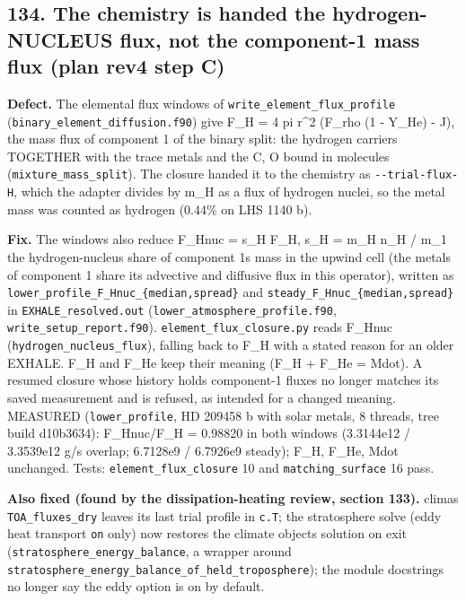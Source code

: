 \documentclass[english,a4paper]{my_memo}
\begin{document}
\subsection{134. The chemistry is handed the hydrogen-NUCLEUS flux, not the component-1 mass flux (plan rev4 step C)}\label{134-the-chemistry-is-handed-the-hydrogen-nucleus-flux-not-the-component-1-mass-flux-plan-rev4-step-c}

\textbf{Defect.} The elemental flux windows of \texttt{write\_element\_flux\_profile}
(\texttt{binary\_element\_diffusion.f90}) give F\_H = 4 pi r\^{}2 (F\_rho (1 - Y\_He) - J),
the mass flux of component 1 of the binary split: the hydrogen carriers
TOGETHER with the trace metals and the C, O bound in molecules
(\texttt{mixture\_mass\_split}). The closure handed it to the chemistry as
\texttt{-\/-trial-flux-H}, which the adapter divides by m\_H as a flux of hydrogen
nuclei, so the metal mass was counted as hydrogen (0.44\% on LHS 1140 b).

\textbf{Fix.} The windows also reduce F\_Hnuc = s\_H F\_H, s\_H = m\_H n\_H / m\_1 the
hydrogen-nucleus share of component 1\textquotesingle s mass in the upwind cell (the metals of
component 1 share its advective and diffusive flux in this operator), written
as \texttt{lower\_profile\_F\_Hnuc\_\{median,spread\}} and \texttt{steady\_F\_Hnuc\_\{median,spread\}}
in \texttt{EXHALE\_resolved.out} (\texttt{lower\_atmosphere\_profile.f90},
\texttt{write\_setup\_report.f90}). \texttt{element\_flux\_closure.py} reads F\_Hnuc
(\texttt{hydrogen\_nucleus\_flux}), falling back to F\_H with a stated reason for an
older EXHALE. F\_H and F\_He keep their meaning (F\_H + F\_He = Mdot). A resumed
closure whose history holds component-1 fluxes no longer matches its saved
measurement and is refused, as intended for a changed meaning.
MEASURED (\texttt{lower\_profile}, HD 209458 b with solar metals, 8 threads, tree
build d10b3634): F\_Hnuc/F\_H = 0.98820 in both windows (3.3144e12 / 3.3539e12
g/s overlap; 6.7128e9 / 6.7926e9 steady); F\_H, F\_He, Mdot unchanged.
Tests: \texttt{element\_flux\_closure} 10 and \texttt{matching\_surface} 16 pass.

\textbf{Also fixed (found by the dissipation-heating review, section 133).} clima\textquotesingle s
\texttt{TOA\_fluxes\_dry} leaves its last trial profile in \texttt{c.T}; the stratosphere
solve (eddy heat transport \texttt{on} only) now restores the climate object\textquotesingle s
solution on exit (\texttt{stratosphere\_energy\_balance}, a wrapper around
\texttt{stratosphere\_energy\_balance\_of\_held\_troposphere}); the module docstrings no
longer say the eddy option is on by default.
\end{document}
